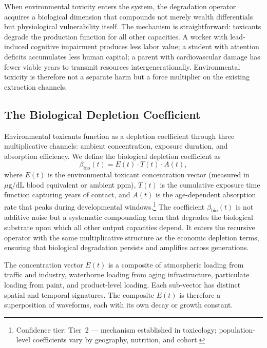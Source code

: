 When environmental toxicity enters the system, the degradation operator acquires
a biological dimension that compounds not merely wealth differentials but
physiological vulnerability itself. The mechanism is straightforward: toxicants
degrade the production function for all other capacities. A worker with
lead-induced cognitive impairment produces less labor value; a student with
attention deficits accumulates less human capital; a parent with cardiovascular
damage has fewer viable years to transmit resources intergenerationally.
Environmental toxicity is therefore not a separate harm but a force multiplier on
the existing extraction channels.

\subsection{The Biological Depletion Coefficient}

Environmental toxicants function as a depletion coefficient through three
multiplicative channels: ambient concentration, exposure duration, and
absorption efficiency. We define the biological depletion coefficient as
\begin{equation}
\beta_{\text{bio}}(t) = E(t) \cdot T(t) \cdot A(t),
\label{eq:biodepletion-coeff}
\end{equation}
where $E(t)$ is the environmental toxicant concentration vector (measured in
$\mu\mathrm{g}/\mathrm{dL}$ blood equivalent or ambient ppm), $T(t)$ is the
cumulative exposure time function capturing years of contact, and $A(t)$ is the
age-dependent absorption rate that peaks during developmental windows.\footnote{Confidence tier: Tier~2 --- mechanism
established in toxicology; population-level coefficients vary by geography,
nutrition, and cohort.} The coefficient $\beta_{\text{bio}}(t)$ is not additive
noise but a systematic compounding term that degrades the biological substrate
upon which all other output capacities depend. It enters the recursive operator
with the same multiplicative structure as the economic depletion terms, ensuring
that biological degradation persists and amplifies across generations.

The concentration vector $E(t)$ is a composite of atmospheric loading from
traffic and industry, waterborne loading from aging infrastructure, particulate
loading from paint, and product-level loading. Each sub-vector has distinct
spatial and temporal signatures. The composite $E(t)$ is therefore a
superposition of waveforms, each with its own decay or growth constant.

